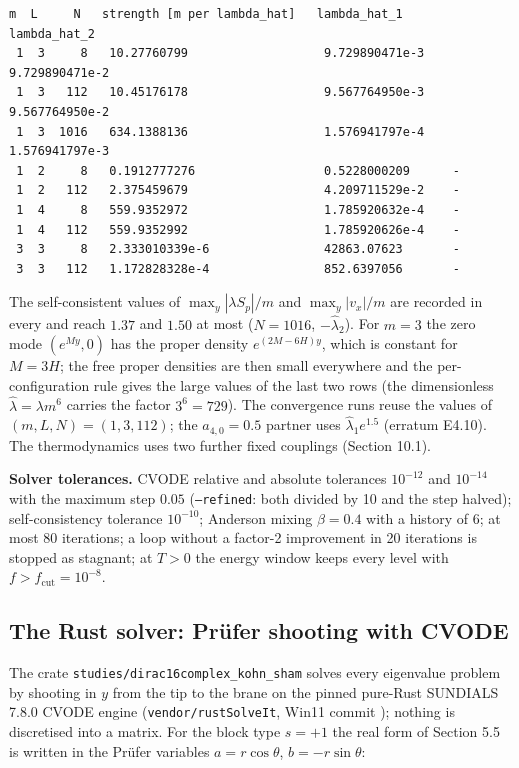 \documentclass[11pt]{article}
\begin{document}
\begin{Verbatim}[fontsize=\small]
 m  L     N   strength [m per lambda_hat]   lambda_hat_1      lambda_hat_2
 1  3     8   10.27760799                   9.729890471e-3    9.729890471e-2
 1  3   112   10.45176178                   9.567764950e-3    9.567764950e-2
 1  3  1016   634.1388136                   1.576941797e-4    1.576941797e-3
 1  2     8   0.1912777276                  0.5228000209      -
 1  2   112   2.375459679                   4.209711529e-2    -
 1  4     8   559.9352972                   1.785920632e-4    -
 1  4   112   559.9352992                   1.785920626e-4    -
 3  3     8   2.333010339e-6                42863.07623       -
 3  3   112   1.172828328e-4                852.6397056       -
\end{Verbatim}

The self-consistent values of $\max_y|\lambda S_p|/m$ and $\max_y|v_x|/m$ are recorded in every \texttt{} and reach $1.37$ and $1.50$ at most ($N=1016$, $-\hat\lambda_2$). For $m=3$ the zero mode $(e^{My},0)$ has the proper density $e^{(2M-6H)y}$, which is constant for $M=3H$; the free proper densities are then small everywhere and the per-configuration rule gives the large values of the last two rows (the dimensionless $\hat\lambda=\lambda m^6$ carries the factor $3^6=729$). The convergence runs reuse the values of $(m,L,N)=(1,3,112)$; the $a_{4,0}=0.5$ partner uses $\hat\lambda_1e^{1.5}$ (erratum E4.10). The thermodynamics uses two further fixed couplings (Section 10.1).

\textbf{Solver tolerances.} CVODE relative and absolute tolerances $10^{-12}$ and $10^{-14}$ with the maximum step $0.05$ (\texttt{--refine\allowbreak{}d}: both divided by 10 and the step halved); self-consistency tolerance $10^{-10}$; Anderson mixing $\beta=0.4$ with a history of 6; at most 80 iterations; a loop without a factor-2 improvement in 20 iterations is stopped as stagnant; at $T>0$ the energy window keeps every level with $f>f_{\mathrm{cut}}=10^{-8}$.

\subsection{The Rust solver: Prüfer shooting with CVODE}

The crate \texttt{studies/\allowbreak{}dirac16c\allowbreak{}omplex\_k\allowbreak{}ohn\_sham} solves every eigenvalue problem by shooting in $y$ from the tip to the brane on the pinned pure-Rust SUNDIALS 7.8.0 CVODE engine (\texttt{vendor/r\allowbreak{}ustSolve\allowbreak{}It}, Win11 commit \texttt{}); nothing is discretised into a matrix. For the block type $s=+1$ the real form of Section 5.5 is written in the Prüfer variables $a=r\cos\theta$, $b=-r\sin\theta$:
\end{document}
